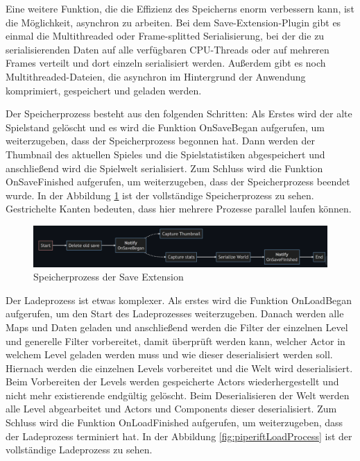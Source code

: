 Eine weitere Funktion, die die Effizienz des Speicherns enorm verbessern kann, ist die Möglichkeit, asynchron zu arbeiten. Bei dem Save-Extension-Plugin gibt es einmal die Multithreaded oder Frame-splitted Serialisierung, bei der die zu serialisierenden Daten auf alle verfügbaren CPU-Threads oder auf mehreren Frames verteilt und dort einzeln serialisiert werden. Außerdem gibt es noch Multithreaded-Dateien, die asynchron im Hintergrund der Anwendung komprimiert, gespeichert und geladen werden.\cite{piperiftPiperiftSaveMultithreaded}

Der Speicherprozess besteht aus den folgenden Schritten: Als Erstes wird der alte Spielstand gelöscht und es wird die Funktion OnSaveBegan aufgerufen, um weiterzugeben, dass der Speicherprozess begonnen hat. Dann werden der Thumbnail des aktuellen Spieles und die Spielstatistiken abgespeichert und anschließend wird die Spielwelt serialisiert. Zum Schluss wird die Funktion OnSaveFinished aufgerufen, um weiterzugeben, dass der Speicherprozess beendet wurde. In der Abbildung \ref{fig:piperiftSaveProcess} ist der vollständige Speicherprozess zu sehen. Gestrichelte Kanten bedeuten, dass hier mehrere Prozesse parallel laufen können.\cite{piperiftSaveProcess}

\begin{figure}[htp]
    \centering
    \includegraphics[width=1\textwidth]{images/piperift_save_process.png}
    \caption{Speicherprozess der Save Extension\cite{piperiftSaveProcess}}
    \label{fig:piperiftSaveProcess}
\end{figure}

Der Ladeprozess ist etwas komplexer. Als erstes wird die Funktion OnLoadBegan aufgerufen, um den Start des Ladeprozesses weiterzugeben. Danach werden alle Maps und Daten geladen und anschließend werden die Filter der einzelnen Level und generelle Filter vorbereitet, damit überprüft werden kann, welcher Actor in welchem Level geladen werden muss und wie dieser deserialisiert werden soll. Hiernach werden die einzelnen Levels vorbereitet und die Welt wird deserialisiert. Beim Vorbereiten der Levels werden gespeicherte Actors wiederhergestellt und nicht mehr existierende endgültig gelöscht. Beim Deserialisieren der Welt werden alle Level abgearbeitet und Actors und Components dieser deserialisiert. Zum Schluss wird die Funktion OnLoadFinished aufgerufen, um weiterzugeben, dass der Ladeprozess terminiert hat. In der Abbildung \ref{fig:piperiftLoadProcess} ist der vollständige Ladeprozess zu sehen.\cite{piperiftLoadProcess}

